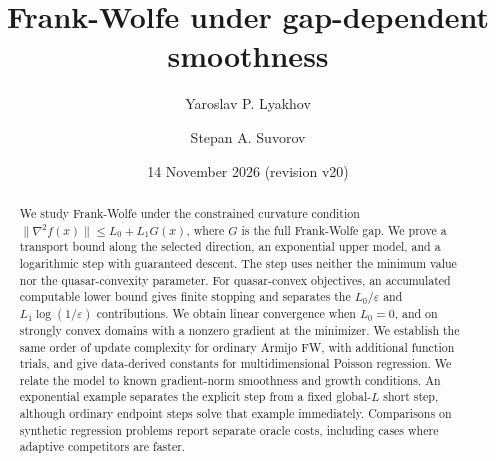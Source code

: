 \documentclass[a4paper,11pt]{article}
\title{Frank-Wolfe under gap-dependent smoothness}
\author{Yaroslav P. Lyakhov \and Stepan A. Suvorov}
\date{14 November 2026 (revision v20)}
\begin{document}
\maketitle
\begin{abstract}
We study Frank-Wolfe under the constrained curvature condition
$\|\nabla^2f(x)\|\le L_0+L_1G(x)$, where $G$ is the full
Frank-Wolfe gap. We prove a transport bound along the selected direction,
an exponential upper model, and a logarithmic step with guaranteed descent.
The step uses neither the minimum value nor the quasar-convexity parameter.
For quasar-convex objectives, an accumulated computable lower bound gives
finite stopping and separates the $L_0/\varepsilon$ and
$L_1\log(1/\varepsilon)$ contributions.
We obtain linear convergence when $L_0=0$, and on strongly convex
domains with a nonzero gradient at the minimizer.
We establish the same order of update complexity for ordinary Armijo FW,
with additional function trials, and give data-derived constants for
multidimensional Poisson regression. We relate the model to known
gradient-norm smoothness and growth conditions. An exponential example
separates the explicit step from a fixed global-$L$ short step, although
ordinary endpoint steps solve that example immediately.
Comparisons on synthetic regression problems report separate oracle costs,
including cases where adaptive competitors are faster.
\end{abstract}









\end{document}
